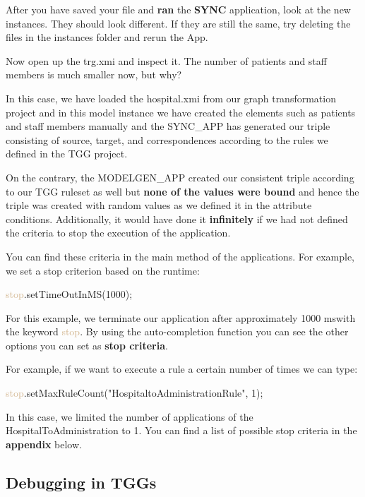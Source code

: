 After you have saved your file and \textbf{ran} the \textbf{SYNC} application, look at the new instances. They should look different. If they are still the same, try deleting the files in the instances folder and rerun the App.

Now open up the \textsf{trg.xmi} and inspect it. The number of patients and staff members is much smaller now, but why?

In this case, we have loaded the \textsf{hospital.xmi} from our graph transformation project and in this model instance we have created the elements such as patients and staff members manually and the SYNC\_APP has generated our triple consisting of source, target, and correspondences according to the rules we defined in the TGG project. 

On the contrary, the MODELGEN\_APP created our consistent triple according to our TGG ruleset as well but \textbf{none of the values were bound} and hence the triple was created with random values as we defined it in the attribute conditions. Additionally, it would have done it \textbf{infinitely} if we had not defined the criteria to stop the execution of the application.\newline

You can find these criteria in the main method of the applications. For example, we set a stop criterion based on the runtime:\newline

\textcolor{Tan}{stop}.setTimeOutInMS(1000);\newline

For this example, we terminate our application after approximately \textsf{1000 ms}with the keyword \textcolor{Tan}{stop}. By using the auto-completion function you can see the other options you can set as \textbf{stop criteria}.

For example, if we want to execute a rule a certain number of times we can type:\newline

\textcolor{Tan}{stop}.setMaxRuleCount("HospitaltoAdministrationRule", 1); \newline

In this case, we limited the number of applications of the HospitalToAdministration to 1. You can find a list of possible stop criteria in the \textbf{appendix} below.

\clearpage

\subsection{ Debugging in TGGs}

